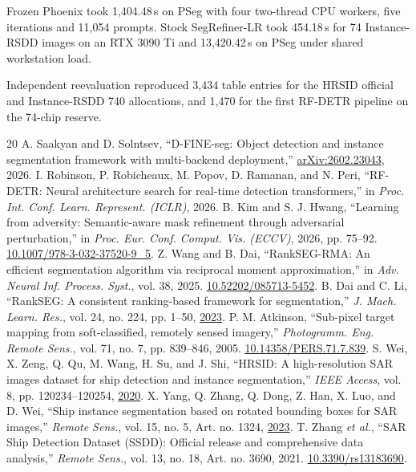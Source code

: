 \documentclass[journal]{IEEEtran}
\begin{document}
Frozen Phoenix took 1,404.48\,s on PSeg with four two-thread CPU workers, five iterations and 11,054 prompts. Stock SegRefiner-LR took 454.18\,s for 74 Instance-RSDD images on an RTX 3090 Ti and 13,420.42\,s on PSeg under shared workstation load. 

Independent reevaluation reproduced 3,434 table entries for the HRSID official and Instance-RSDD 740 allocations, and 1,470 for the first RF-DETR pipeline on the 74-chip reserve.

\begin{thebibliography}{20}
 A. Saakyan and D. Solntsev, ``D-FINE-seg: Object detection and instance segmentation framework with multi-backend deployment,'' \href{https://arxiv.org/abs/2602.23043}{arXiv:2602.23043}, 2026.
 I. Robinson, P. Robicheaux, M. Popov, D. Ramanan, and N. Peri, ``RF-DETR: Neural architecture search for real-time detection transformers,'' in \emph{Proc. Int. Conf. Learn. Represent. (ICLR)}, 2026.
 B. Kim and S. J. Hwang, ``Learning from adversity: Semantic-aware mask refinement through adversarial perturbation,'' in \emph{Proc. Eur. Conf. Comput. Vis. (ECCV)}, 2026, pp. 75--92. \href{https://doi.org/10.1007/978-3-032-37520-9_5}{10.1007/978-3-032-37520-9\_5}.
 Z. Wang and B. Dai, ``RankSEG-RMA: An efficient segmentation algorithm via reciprocal moment approximation,'' in \emph{Adv. Neural Inf. Process. Syst.}, vol. 38, 2025. \href{https://doi.org/10.52202/085713-5452}{10.52202/085713-5452}.
 B. Dai and C. Li, ``RankSEG: A consistent ranking-based framework for segmentation,'' \emph{J. Mach. Learn. Res.}, vol. 24, no. 224, pp. 1--50, \href{https://www.jmlr.org/papers/v24/22-0712.html}{2023}.
 P. M. Atkinson, ``Sub-pixel target mapping from soft-classified, remotely sensed imagery,'' \emph{Photogramm. Eng. Remote Sens.}, vol. 71, no. 7, pp. 839--846, 2005. \href{https://doi.org/10.14358/PERS.71.7.839}{10.14358/PERS.71.7.839}.
 S. Wei, X. Zeng, Q. Qu, M. Wang, H. Su, and J. Shi, ``HRSID: A high-resolution SAR images dataset for ship detection and instance segmentation,'' \emph{IEEE Access}, vol. 8, pp. 120234--120254, \href{https://doi.org/10.1109/ACCESS.2020.3005861}{2020}.
 X. Yang, Q. Zhang, Q. Dong, Z. Han, X. Luo, and D. Wei, ``Ship instance segmentation based on rotated bounding boxes for SAR images,'' \emph{Remote Sens.}, vol. 15, no. 5, Art. no. 1324, \href{https://doi.org/10.3390/rs15051324}{2023}.
 T. Zhang \emph{et al.}, ``SAR Ship Detection Dataset (SSDD): Official release and comprehensive data analysis,'' \emph{Remote Sens.}, vol. 13, no. 18, Art. no. 3690, 2021. \href{https://doi.org/10.3390/rs13183690}{10.3390/rs13183690}.

\end{thebibliography}
\end{document}
